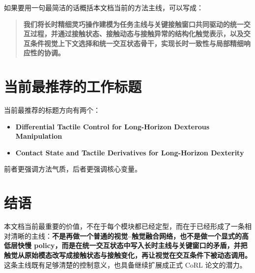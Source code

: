 \documentclass[11pt]{article}
\begin{document}
如果要用一句最简洁的话概括本文档当前的方法主线，可以写成：

\begin{quote}
\textbf{我们将长时精细灵巧操作建模为任务主线与关键接触窗口共同驱动的统一交互过程，并通过接触状态、接触动态与接触异常的结构化触觉表示，以及交互条件视觉上下文选择和统一交互状态骨干，实现长时一致性与局部精细响应性的协调。}
\end{quote}

\section{当前最推荐的工作标题}

当前最推荐的标题方向有两个：

\begin{itemize}[leftmargin=2em]
    \item \textbf{Differential Tactile Control for Long-Horizon Dexterous Manipulation}
    \item \textbf{Contact State and Tactile Derivatives for Long-Horizon Dexterity}
\end{itemize}

前者更强调方法气质，后者更强调核心变量。

\section{结语}

本文档当前最重要的价值，不在于每个模块都已经定型，而在于已经形成了一条相对清晰的主线：\textbf{不是再做一个普通的视觉--触觉融合网络，也不是做一个显式的高低层快慢 policy，而是在统一交互状态中写入长时主线与关键窗口的矛盾，并把触觉从原始模态改写成接触状态与接触变化，再让视觉在交互条件下被动态调用。} 这条主线既有足够清楚的控制意义，也具备继续扩展成正式 CoRL 论文的潜力。
\end{document}

